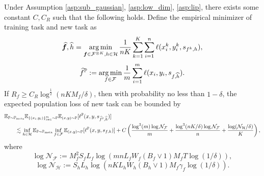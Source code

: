\documentclass[11pt]{article}
\numberwithin{equation}{section}
\newcommand{\Pmeta}{\mathbb{P}_{\text{meta}}}
\renewcommand{\P}{\mathbb{P}}
\begin{document}
\begin{thm}
\label{thm:generalization_all}
    Under Assumption \ref{asp:sub_gaussian}, \ref{asp:low_dim}, \ref{asp:lip},
    there exists some constant $C,C_R$ such that the following holds.
    Define the empirical minimizer of training task and new task as
    \begin{equation}
        \widehat{{\bm{f}}},\widehat{h}=\operatorname*{arg\,min}_{{\bm{f}}\in\mathcal{F}^{\otimes K},h\in\mathcal{H}} \frac{1}{nK}\sum_{k=1}^K\sum_{i=1}^n\ell(x_i^k,y_i^k,s_{f^k,h}),
    \end{equation}
    \begin{equation}
        \widehat{f}^\P:= \argmin_{f\in\mathcal{F}} \frac{1}{m}\sum_{i=1}^m \ell(x_i,y_i,s_{f,\widehat{h}}).
    \end{equation}
    If $R_f\geq C_R\log^{\frac{1}{2}}(nKM_f/\delta)$,
    then with probability no less than $1-\delta$, the expected population loss of new task can be bounded by
    \begin{equation}
        \begin{aligned}
            &\E_{\P\sim\Pmeta}\E_{\{(x_i,y_i)\}_{i=1}^m\sim \P} \E_{(x,y)\sim\P} [\ell^\P(x,y,s_{\widehat{f}^\P,\widehat{h}})] \\
            &\qquad \lesssim \inf_{h\in\mathcal{H}} \E_{\P\sim\Pmeta} \inf_{f\in\mathcal{F}}\E_{(x,y)\sim\P} [\ell^\P (x,y,s_{f,h})] + C \left(\frac{\log^3(m)\log\mathcal{N}_\mathcal{F}}{m} + \frac{\log^3(nK/\delta)\log\mathcal{N}_\mathcal{F}}{n}+\frac{\log(\mathcal{N}_\mathcal{H}/\delta)}{K}\right),
        \end{aligned}
    \end{equation}
    where
    \begin{equation}
        \log\mathcal{N}_\mathcal{F}:=M_f^2S_fL_f\log\left(mnL_fW_f(B_f\vee 1)M_fT\log(1/\delta)\right),
    \end{equation}
    \begin{equation}
        \log\mathcal{N}_\mathcal{H}:=S_hL_h\log\left(nKL_hW_h(B_h\vee 1)M_f\gamma_f\log(1/\delta)\right).
    \end{equation}
\end{thm}
\end{document}
